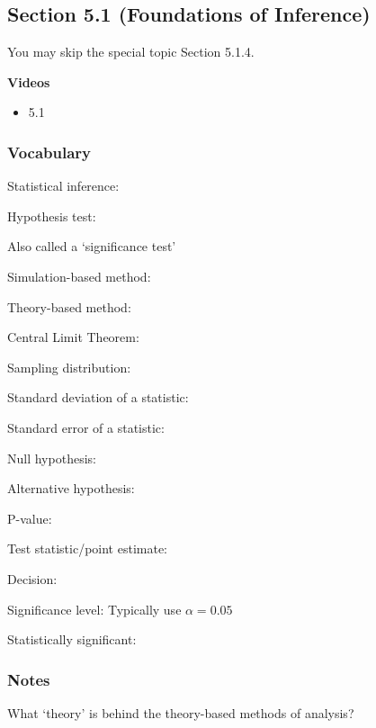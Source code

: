 \documentclass[
]{report}
\providecommand{\tightlist}{%
  \setlength{\itemsep}{0pt}\setlength{\parskip}{0pt}}
\newcommand{\rgs}{\vspace{12pt}} %
\newcommand{\rgi}{\hspace{24pt}}  %
\begin{document}
\hypertarget{section-5.1-foundations-of-inference}{%
\subsection{Section 5.1 (Foundations of Inference)}\label{section-5.1-foundations-of-inference}}

You may skip the special topic Section 5.1.4.

\textbf{Videos}

\begin{itemize}
\tightlist
\item
  5.1
\end{itemize}


\hypertarget{vocabulary-10}{%
\subsubsection*{Vocabulary}\label{vocabulary-10}}

Statistical inference:
\rgs

Hypothesis test:

\rgi Also called a `significance test'
\rgs

Simulation-based method:
\rgs

Theory-based method:
\rgs

Central Limit Theorem:
\rgs

Sampling distribution:
\rgs

Standard deviation of a statistic:
\rgs

Standard error of a statistic:
\rgs

Null hypothesis:
\rgs

Alternative hypothesis:
\rgs

P-value:
\rgs

Test statistic/point estimate:
\rgs

Decision:
\rgs

Significance level:
\rgi 
\rgs Typically use \(\alpha=0.05\)

Statistically significant:
\rgs

\hypertarget{notes-15}{%
\subsubsection*{Notes}\label{notes-15}}

What `theory' is behind the theory-based methods of analysis?
\rgs
\end{document}
